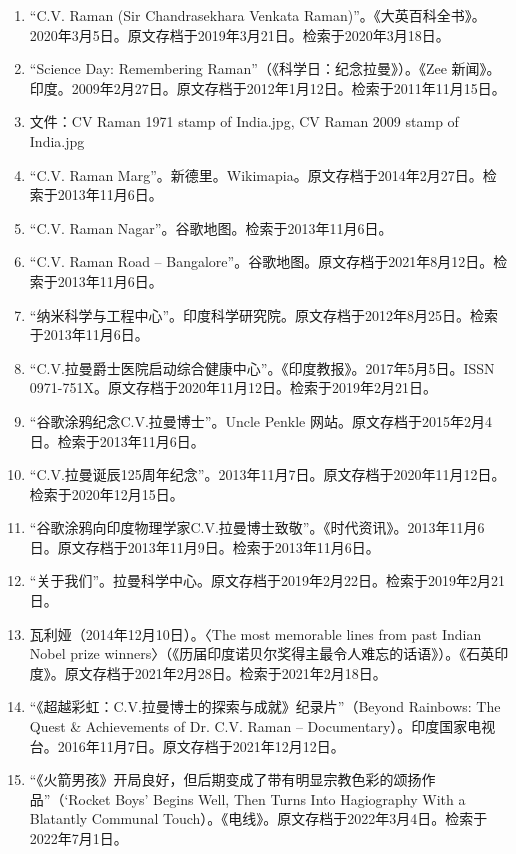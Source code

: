 \begin{enumerate}
\item “C.V. Raman (Sir Chandrasekhara Venkata Raman)”。《大英百科全书》。2020年3月5日。原文存档于2019年3月21日。检索于2020年3月18日。
\item “Science Day: Remembering Raman”（《科学日：纪念拉曼》）。《Zee 新闻》。印度。2009年2月27日。原文存档于2012年1月12日。检索于2011年11月15日。
\item 文件：CV Raman 1971 stamp of India.jpg, CV Raman 2009 stamp of India.jpg
\item “C.V. Raman Marg”。新德里。Wikimapia。原文存档于2014年2月27日。检索于2013年11月6日。
\item “C.V. Raman Nagar”。谷歌地图。检索于2013年11月6日。
\item “C.V. Raman Road – Bangalore”。谷歌地图。原文存档于2021年8月12日。检索于2013年11月6日。
\item “纳米科学与工程中心”。印度科学研究院。原文存档于2012年8月25日。检索于2013年11月6日。
\item “C.V.拉曼爵士医院启动综合健康中心”。《印度教报》。2017年5月5日。ISSN 0971-751X。原文存档于2020年11月12日。检索于2019年2月21日。
\item “谷歌涂鸦纪念C.V.拉曼博士”。Uncle Penkle 网站。原文存档于2015年2月4日。检索于2013年11月6日。
\item “C.V.拉曼诞辰125周年纪念”。2013年11月7日。原文存档于2020年11月12日。检索于2020年12月15日。
\item “谷歌涂鸦向印度物理学家C.V.拉曼博士致敬”。《时代资讯》。2013年11月6日。原文存档于2013年11月9日。检索于2013年11月6日。
\item “关于我们”。拉曼科学中心。原文存档于2019年2月22日。检索于2019年2月21日。
\item 瓦利娅（2014年12月10日）。〈The most memorable lines from past Indian Nobel prize winners〉（《历届印度诺贝尔奖得主最令人难忘的话语》）。《石英印度》。原文存档于2021年2月28日。检索于2021年2月18日。
\item “《超越彩虹：C.V.拉曼博士的探索与成就》纪录片”（Beyond Rainbows: The Quest & Achievements of Dr. C.V. Raman – Documentary）。印度国家电视台。2016年11月7日。原文存档于2021年12月12日。
\item “《火箭男孩》开局良好，但后期变成了带有明显宗教色彩的颂扬作品”（‘Rocket Boys’ Begins Well, Then Turns Into Hagiography With a Blatantly Communal Touch）。《电线》。原文存档于2022年3月4日。检索于2022年7月1日。
\end{enumerate}
